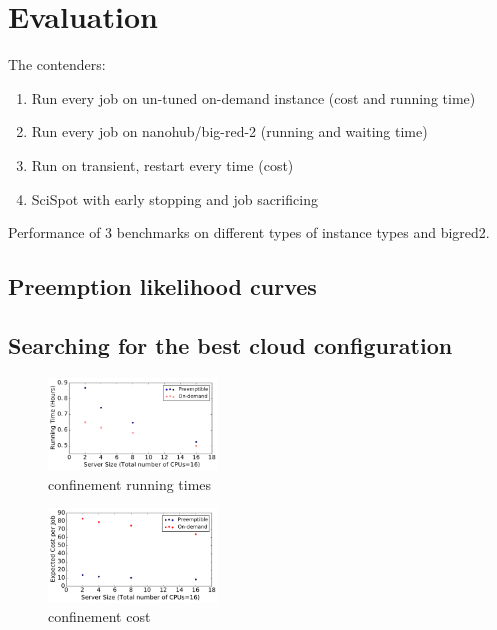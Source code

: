 \section{Evaluation}

The contenders:
\begin{enumerate}
\item Run every job on un-tuned on-demand instance (cost and running time)
\item Run every job on nanohub/big-red-2 (running and waiting time)
\item Run on transient, restart every time (cost)
\item SciSpot with early stopping and job sacrificing 
\end{enumerate}

Performance of 3 benchmarks on different types of instance types and bigred2.



\subsection{Preemption likelihood curves}


\subsection{Searching for the best cloud configuration}

\begin{figure}[h]
  \centering
  \includegraphics[width=0.4\textwidth]{../graphs/confin_16_time.pdf}
  \caption{confinement running times}
  \label{fig:confin-16-times}
\end{figure}


\begin{figure}[h]
  \centering
  \includegraphics[width=0.4\textwidth]{../graphs/confin_16_cost.pdf}
  \caption{confinement cost}
  \label{fig:confin-16-cost}
\end{figure}


